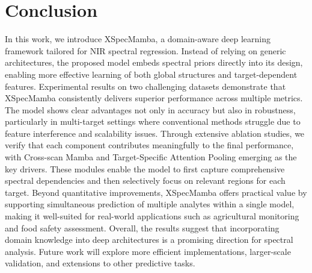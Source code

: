 \documentclass[pdflatex,sn-mathphys-num]{sn-jnl}%
\begin{document}
\section{Conclusion}

In this work, we introduce XSpecMamba, a domain-aware deep learning framework tailored for NIR spectral regression. Instead of relying on generic architectures, the proposed model embeds spectral priors directly into its design, enabling more effective learning of both global structures and target-dependent features. Experimental results on two challenging datasets demonstrate that XSpecMamba consistently delivers superior performance across multiple metrics. The model shows clear advantages not only in accuracy but also in robustness, particularly in multi-target settings where conventional methods struggle due to feature interference and scalability issues. Through extensive ablation studies, we verify that each component contributes meaningfully to the final performance, with Cross-scan Mamba and Target-Specific Attention Pooling emerging as the key drivers. These modules enable the model to first capture comprehensive spectral dependencies and then selectively focus on relevant regions for each target. Beyond quantitative improvements, XSpecMamba offers practical value by supporting simultaneous prediction of multiple analytes within a single model, making it well-suited for real-world applications such as agricultural monitoring and food safety assessment. Overall, the results suggest that incorporating domain knowledge into deep architectures is a promising direction for spectral analysis. Future work will explore more efficient implementations, larger-scale validation, and extensions to other predictive tasks.
\end{document}
